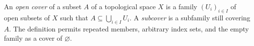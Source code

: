 
An \emph{open cover} of a subset $A$ of a topological space $X$ is a family $(U_i)_{i\in I}$ of open subsets of $X$ such that $A\subseteq\bigcup_{i\in I}U_i$. A \emph{subcover} is a subfamily still covering $A$. The definition permits repeated members, arbitrary index sets, and the empty family as a cover of $\varnothing$.
